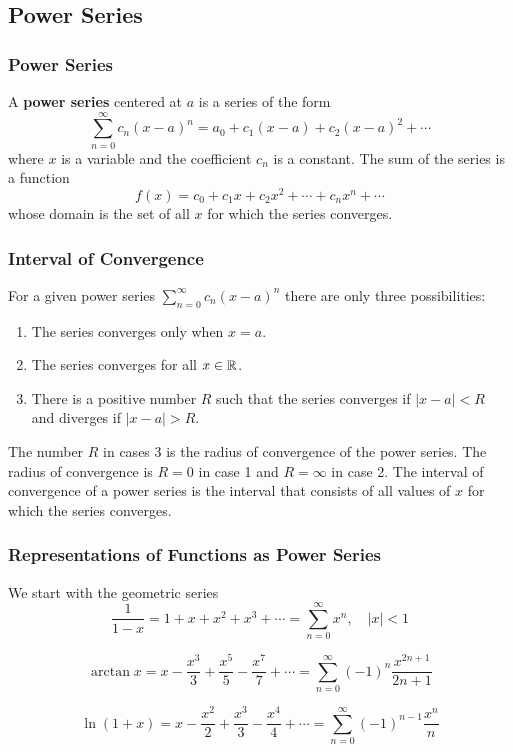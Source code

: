 \subsection{Power Series}

\subsubsection*{Power Series}
A \textbf{power series} centered at \(a\) is a series of the form
\[\sum_{n=0}^{\infty}c_n(x-a)^n=a_0+c_1(x-a)+c_2(x-a)^2+\cdots\]
where \(x\) is a variable and the coefficient \(c_n\) is a constant.
The sum of the series is a function
\[f(x)=c_0+c_1x+c_2x^2+\cdots+c_nx^n+\cdots\]
whose domain is the set of all \(x\) for which the series converges.

\subsubsection*{Interval of Convergence}
\begin{theorem}
    For a given power series \(\sum_{n=0}^\infty c_n(x-a)^n\) there are only
    three possibilities:
    \begin{enumerate}
        \item The series converges only when \(x=a\).
        \item The series converges for all \(x\in\mathbb{R}\).
        \item There is a positive number \(R\) such that the series converges
        if \(|x-a|<R\) and diverges if \(|x-a|>R\).
    \end{enumerate}
\end{theorem}
The number \(R\) in cases 3 is the radius of convergence of the power series.
The radius of convergence is \(R=0\) in case 1 and \(R=\infty\) in case 2.
The interval of convergence of a power series is the interval that consists of
all values of \(x\) for which the series converges.

\subsubsection*{Representations of Functions as Power Series}
We start with the geometric series
\[\frac{1}{1-x}=1+x+x^2+x^3+\cdots=\sum_{n=0}^\infty x^n,\quad|x|<1\]

\[\arctan x=x-\frac{x^3}{3}+\frac{x^5}{5}-\frac{x^7}{7}+\cdots
=\sum_{n=0}^\infty(-1)^n\frac{x^{2n+1}}{2n+1}\]

\[\ln(1+x)=x-\frac{x^2}{2}+\frac{x^3}{3}-\frac{x^4}{4}+\cdots
=\sum_{n=0}^\infty(-1)^{n-1}\frac{x^n}{n}\]

